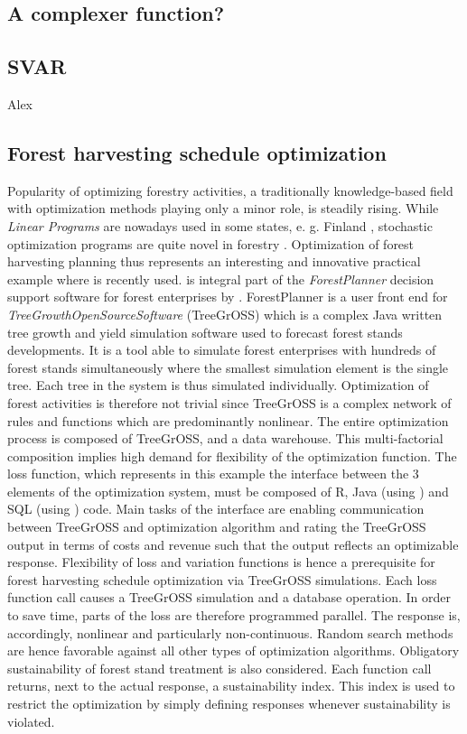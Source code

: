 \subsection{A complexer function?}

\subsection{SVAR}
Alex
\subsection{Forest harvesting schedule optimization}
Popularity of optimizing forestry activities, a traditionally knowledge-based field with optimization methods playing only a minor role, is steadily rising. While \textit{Linear Programs} are nowadays used in some states, e. g. Finland \citep{redsven_2012}, stochastic optimization programs are quite novel in forestry \citep{kangas_2015}. Optimization of forest harvesting planning thus represents an interesting and innovative practical example where  is recently used.  is integral part of the \textit{ForestPlanner} decision support software for forest enterprises by \citet{hansen_2014}. ForestPlanner is a user front end for \textit{TreeGrowthOpenSourceSoftware} (TreeGrOSS) which is a complex Java written tree growth and yield simulation software used to forecast forest stands developments. It is a tool able to simulate forest enterprises with hundreds of forest stands simultaneously where the smallest simulation element is the single tree. Each tree in the system is thus simulated individually. Optimization of forest activities is therefore not trivial since TreeGrOSS is a complex network of rules and functions which are predominantly nonlinear. The entire optimization process is composed of TreeGrOSS,  and a data warehouse. This multi-factorial composition implies high demand for flexibility of the optimization function. The loss function, which represents in this example the interface between the 3 elements of the optimization system, must be composed of R, Java (using ) and SQL (using ) code. Main tasks of the interface are enabling communication between TreeGrOSS and optimization algorithm and rating the TreeGrOSS output in terms of costs and revenue such that the output reflects an optimizable response. Flexibility of loss and variation functions is hence a prerequisite for forest harvesting schedule optimization via TreeGrOSS simulations. Each loss function call causes a TreeGrOSS simulation and a database operation. In order to save time, parts of the loss are therefore programmed parallel. The response is, accordingly, nonlinear and particularly non-continuous. Random search methods are hence favorable against all other types of optimization algorithms. Obligatory sustainability of forest stand treatment is also considered. Each function call returns, next to the actual response, a sustainability index. This index is used to restrict the optimization by simply defining  responses whenever sustainability is violated.

